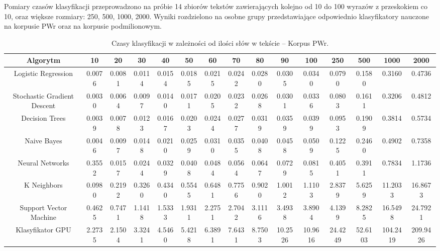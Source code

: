 Pomiary czasów klasyfikacji przeprowadzono na próbie 14 zbiorów tekstów zawierających kolejno od 10 do 100 wyrazów z przeskokiem co 10, oraz większe rozmiary: 250, 500, 1000, 2000. Wyniki rozdzielono na osobne grupy przedstawiające odpowiednio klasyfikatory nauczone na korpusie PWr oraz na korpusie podmilionowym.

\newpage

\begin{landscape}
	\begin{table}[H]
		\centering
		\caption{Czasy klasyfikacji w zależności od ilości słów w tekście -- Korpus PWr.}
		\begin{tabular}{ccccccccccccccc}
			\toprule
			\textbf{Algorytm} & \textbf{10} & \textbf{20} & \textbf{30} & \textbf{40} & \textbf{50} & \textbf{60} & \textbf{70} & \textbf{80} & \textbf{90} & \textbf{100} & \textbf{250} & \textbf{500} & \textbf{1000} & \textbf{2000} \\
			\midrule
            Logistic Regression & 0.0076 & 0.0081 & 0.0114 & 0.0154 & 0.0185 & 0.0215 & 0.0242 & 0.0280 & 0.0305 & 0.0340 & 0.0790 & 0.1580 & 0.3160 & 0.4736 \\
			Stochastic Gradient Descent & 0.0030 & 0.0064 & 0.0097 & 0.0140 & 0.0171 & 0.0205 & 0.0232 & 0.0268 & 0.0301 & 0.0336 & 0.0803 & 0.1611 & 0.3206 & 0.4812 \\
			Decision Trees & 0.0039 & 0.0078 & 0.0123 & 0.0167 & 0.0203 & 0.0244 & 0.0277 & 0.0319 & 0.0359 & 0.0399 & 0.0953 & 0.1909 & 0.3814 & 0.5734 \\
			Naive Bayes & 0.0046 & 0.0097 & 0.0148 & 0.0210 & 0.0259 & 0.0310 & 0.0355 & 0.0408 & 0.0458 & 0.0509 & 0.1225 & 0.2460 & 0.4902 & 0.7358 \\
			Neural Networks & 0.3552 & 0.0157 & 0.0244 & 0.0329 & 0.0408 & 0.0484 & 0.0564 & 0.0647 & 0.0729 & 0.0815 & 0.4051 & 0.3911 & 0.7834 & 1.1736 \\
			K Neighbors & 0.0980 & 0.2192 & 0.3260 & 0.4340 & 0.5545 & 0.6481 & 0.7756 & 0.9020 & 1.0012 & 1.1103 & 2.8379 & 5.6259 & 11.2033 & 16.8673 \\
			Support Vector Machine & 0.4625 & 0.7471 & 1.1418 & 1.5333 & 1.9311 & 2.2751 & 2.7042 & 3.1116 & 3.4938 & 3.8904 & 4.1399 & 8.2825 & 16.5498 & 24.7921 \\
			Klasyfikator GPU & 2.2735 & 2.1504 & 3.3241 & 4.5460 & 5.4218 & 6.3891 & 7.6431 & 8.7503 & 10.2526 & 10.9616 & 24.4249 & 52.6103 & 104.2419 & 209.9426 \\
			\bottomrule
		\end{tabular}
	\end{table}
	

\end{landscape}
